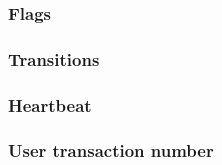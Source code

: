 \subsubsection{Flags}                   \label{user txn data: generalities: perspectives: flags}                        
\subsubsection{Transitions}             \label{user txn data: generalities: perspectives: transitions}                  
\subsubsection{Heartbeat}               \label{user txn data: generalities: perspectives: heartbeat}                    
\subsubsection{User transaction number} \label{user txn data: generalities: perspectives: user transaction number}      
